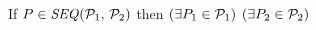   \noindent
  If $\aPS \in \sSEMI{\aPSS_1}{\aPSS_2}$ then $(\exists P_1\in\mathcal{P}_1)$
  $(\exists P_2\in\mathcal{P}_2)$
